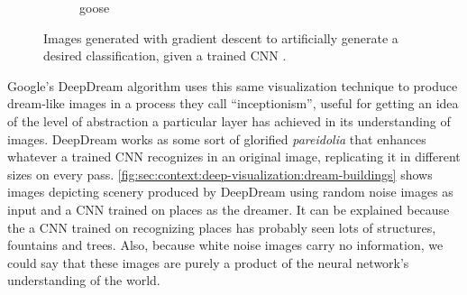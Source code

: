 \begin{figure}[htbp]
\begin{subfigure}[b]{0.3\textwidth}
    \caption{goose}
    \label{fig:sec:context:deep-visualization-class-6}
  \end{subfigure}
  \caption{
    Images generated with gradient descent to artificially generate a desired classification, given a trained CNN \cite{Simonyan2014B}.
  }
  \label{fig:sec:context:deep-visualization-class}
\end{figure}

Google's DeepDream algorithm \cite{Mordvintsev2015} uses this same visualization technique to produce dream-like images in a process they call ``inceptionism'', useful for getting an idea of the level of abstraction a particular layer has achieved in its understanding of images.
DeepDream works as some sort of glorified \emph{pareidolia} that enhances whatever a trained CNN recognizes in an original image, replicating it in different sizes on every pass.
\autoref{fig:sec:context:deep-visualization:dream-buildings} shows images depicting scenery produced by DeepDream using random noise images as input and a CNN trained on places as the dreamer.
It can be explained because the a CNN trained on recognizing places has probably seen lots of structures, fountains and trees.
Also, because white noise images carry no information, we could say that these images are purely a product of the neural network's understanding of the world.

